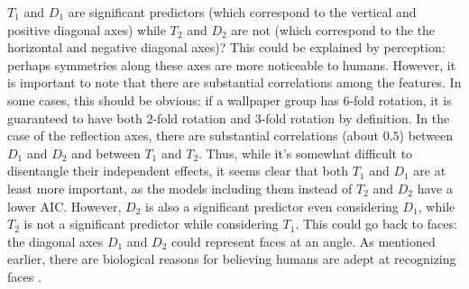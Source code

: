 $T_1$ and $D_1$ are significant predictors (which correspond to the vertical and positive diagonal axes) while $T_2$ and $D_2$ are not (which correspond to the the horizontal and negative diagonal axes)? This could be explained by perception: perhaps symmetries along these axes are more noticeable to humans. However, it is important to note that there are substantial correlations among the features. In some cases, this should be obvious: if a wallpaper group has 6-fold rotation, it is guaranteed to have both 2-fold rotation and 3-fold rotation by definition. In the case of the reflection axes, there are substantial correlations (about $0.5$) between $D_1$ and $D_2$ and between $T_1$ and $T_2$. Thus, while it's somewhat difficult to disentangle their independent effects, it seems clear that both $T_1$ and $D_1$ are at least more important, as the models including them instead of $T_2$ and $D_2$ have a lower AIC. However, $D_2$ is also a significant predictor even considering $D_1$, while $T_2$ is not a significant predictor while considering $T_1$. This could go back to faces: the diagonal axes $D_1$ and $D_2$ could represent faces at an angle. As mentioned earlier, there are biological reasons for believing humans are adept at recognizing faces \cite{ffa}.     

